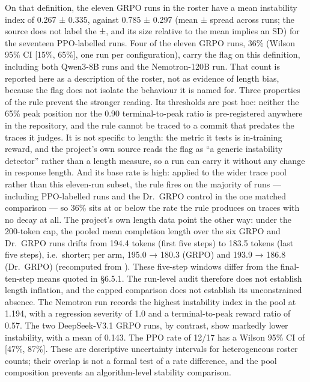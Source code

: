 \documentclass[12pt,a4paper]{report}
\DeclareRobustCommand{\longtok}[1]{\texttt{\seqsplit{#1}}}
\begin{document}
On that definition, the eleven GRPO runs in the roster have a mean
instability index of 0.267 ± 0.335, against 0.785 ± 0.297 (mean ± spread
across runs; the source does not label the ±, and its size relative to
the mean implies an SD) for the seventeen PPO-labelled runs. Four of the
eleven GRPO runs, 36\% (Wilson 95\% CI {[}15\%, 65\%{]}, one run per
configuration), carry the flag on this definition, including both
Qwen3-8B runs and the Nemotron-120B run. That count is reported here as
a description of the roster, not as evidence of length bias, because the
flag does not isolate the behaviour it is named for. Three properties of
the rule prevent the stronger reading. Its thresholds are post hoc:
neither the 65\% peak position nor the 0.90 terminal-to-peak ratio is
pre-registered anywhere in the repository, and the rule cannot be traced
to a commit that predates the traces it judges. It is not specific to
length: the metric it tests is in-training reward, and the project's own
source reads the flag as ``a generic instability detector'' rather than
a length measure, so a run can carry it without any change in response
length. And its base rate is high: applied to the wider trace pool
rather than this eleven-run subset, the rule fires on the majority of
runs --- including PPO-labelled runs and the Dr.~GRPO control in the one
matched comparison --- so 36\% sits at or below the rate the rule
produces on traces with no decay at all. The project's own length data
point the other way: under the 200-token cap, the pooled mean completion
length over the six GRPO and Dr.~GRPO runs drifts from 194.4 tokens
(first five steps) to 183.5 tokens (last five steps), i.e.~shorter; per
arm, 195.0 → 180.3 (GRPO) and 193.9 → 186.8 (Dr.~GRPO) (recomputed from
\longtok{drgrpo\_\allowbreak{}gsm8k\_\allowbreak{}cot\_\allowbreak{}full.json}). These five-step windows differ
from the final-ten-step means quoted in §6.5.1. The run-level audit
therefore does not establish length inflation, and the capped comparison
does not establish its unconstrained absence. The Nemotron run records
the highest instability index in the pool at 1.194, with a regression
severity of 1.0 and a terminal-to-peak reward ratio of 0.57. The two
DeepSeek-V3.1 GRPO runs, by contrast, show markedly lower instability,
with a mean of 0.143. The PPO rate of 12/17 has a Wilson 95\% CI of
{[}47\%, 87\%{]}. These are descriptive uncertainty intervals for
heterogeneous roster counts; their overlap is not a formal test of a
rate difference, and the pool composition prevents an algorithm-level
stability comparison.
\end{document}
